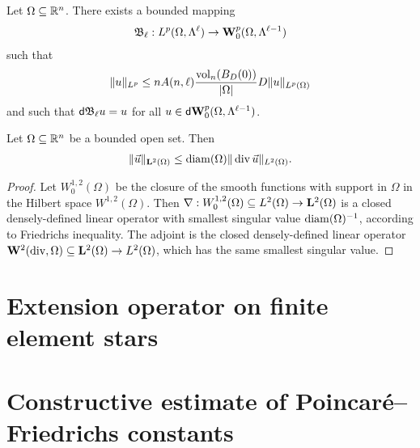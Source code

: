 \documentclass[a4paper]{article}
\begin{document}
\begin{lemma}
    Let $\Omega \subseteq {\mathbb R}^{n}$. There exists a bounded mapping 
    \begin{align*}
     {\mathfrak B}_{\ell} : L^{p}(\Omega,\Lambda^{\ell}) \rightarrow {\mathbf W}^{p}_{0}(\Omega,\Lambda^{\ell-1})
    \end{align*}
    such that 
    \begin{align*}
        \| u \|_{L^{p}} \leq n A(n,\ell) \frac{ \operatorname{vol}_{n}(B_D(0)) }{|\Omega|} D \| u \|_{L^{p}(\Omega)}
    \end{align*}
    and such that ${\mathsf d} {\mathfrak B}_{\ell} u = u$ for all $u \in {\mathsf d} {\mathbf W}^{p}_{0}(\Omega,\Lambda^{\ell-1})$.
\end{lemma}




\begin{lemma}
    Let $\Omega \subseteq {\mathbb R}^{n}$ be a bounded open set. Then 
    \begin{align*}
        \| \vec u \|_{{\mathbf L}^{2}(\Omega)} \leq {\operatorname{diam}}(\Omega) \| \operatorname{div} \vec u \|_{L^{2}(\Omega)}.
    \end{align*}
\end{lemma}
\begin{proof}
    Let $W^{1,2}_{0}(\Omega)$ be the closure of the smooth functions with support in $\Omega$ in the Hilbert space $W^{1,2}(\Omega)$. 
    Then $\nabla : W^{1,2}_{0}(\Omega) \subseteq L^{2}(\Omega) \rightarrow {\mathbf L}^{2}(\Omega)$ is a closed densely-defined linear operator 
    with smallest singular value ${\operatorname{diam}}(\Omega)^{-1}$, according to Friedrichs inequality. 
    The adjoint is the closed densely-defined linear operator ${\mathbf W}^{2}(\operatorname{div},\Omega) \subseteq {\mathbf L}^{2}(\Omega) \rightarrow L^{2}(\Omega)$,
    which has the same smallest singular value. 
\end{proof}















\section{Extension operator on finite element stars}\label{section:extension}

\section{Constructive estimate of Poincar\'e--Friedrichs constants}\label{section:poincarefriedrichs}
\end{document}
